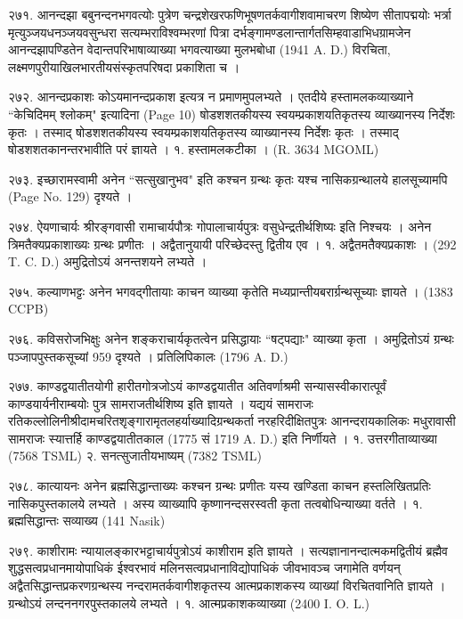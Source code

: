 २७१. आनन्दझा
बबुनन्दनभगवत्योः पुत्रेण चन्द्रशेखरफणिभूषणतर्कवागीशवामाचरण शिष्येण सीतापद्मयोः भर्त्रा मृत्युञ्जयधनञ्जयवसुन्धरा सत्यम्भराविश्वम्भरणां पित्रा दर्भङ्गामण्डलान्तार्गतसिम्हवाडाभिधग्रामजेन आनन्दझापण्डितेन वेदान्तपरिभाषाव्याख्या भगवत्याख्या मुलभबोधा (1941 A. D.) विरचिता, लक्ष्मणपुरीयाखिलभारतीयसंस्कृतपरिषदा प्रकाशिता च ।

२७२. आनन्दप्रकाशः
कोऽयमानन्दप्रकाश इत्यत्र न प्रमाणमुपलभ्यते । एतदीये हस्तामलकव्याख्याने ``केचिदिमम् श्लोकम्" इत्यादिना (Page 10) षोडशशतकीयस्य स्वयम्प्रकाशयतिकृतस्य व्याख्यानस्य निर्देशः कृतः । तस्माद् षोडशशतकीयस्य स्वयम्प्रकाशयतिकृतस्य व्याख्यानस्य निर्देशः कृतः । तस्माद् षोडशशतकानन्तरभावीति परं ज्ञायते ।
१. हस्तामलकटीका । (R. 3634 MGOML)

२७३. इच्छारामस्वामी
अनेन ``सत्सुखानुभव" इति कश्चन ग्रन्थः कृतः यश्च नासिकग्रन्थालये हालसूच्यामपि (Page No. 129) दृश्यते ।

२७४. ऐयणाचार्यः
श्रीरङ्गवासी रामाचार्यपौत्रः गोपालाचार्यपुत्रः वसुधेन्द्रतीर्थशिष्यः इति निश्चयः । अनेन त्रिमतैक्यप्रकाशाख्यः ग्रन्थः प्रणीतः । अद्वैतानुयायी परिच्छेदस्तु द्वितीय एव ।
१. अद्वैतमतैक्यप्रकाशः । (292 T. C. D.) अमुद्रितोऽयं अनन्तशयने लभ्यते ।

२७५. कल्याणभट्टः
अनेन भगवद्गीतायाः काचन व्याख्या कृतेति मध्यप्रान्तीयबरार्ग्रन्थसूच्याः ज्ञायते । (1383 CCPB)

२७६. कविसरोजभिक्षुः
अनेन शङ्कराचार्यकृतत्वेन प्रसिद्धायाः ``षट्पद्याः" व्याख्या कृता । अमुद्रितोऽयं ग्रन्थः पञ्जापपुस्तकसूच्यां 959 दृश्यते । प्रतिलिपिकालः (1796 A. D.)

२७७. काण्डद्वयातीतयोगी
हारीतगोत्रजोऽयं काण्डद्वयातीत अतिवर्णाश्रमी सन्यासस्वीकारात्पूर्वं काण्डयार्यनीराम्बयोः पुत्र सामराजतीर्थशिष्य इति ज्ञायते । यद्ययं सामराजः रतिकल्लोलिनीश्रीदामचरितशृङ्गारामृतलहर्याख्यादिग्रन्थकर्ता नरहरिदीक्षितपुत्रः आनन्दरायकालिकः मधुरावासी सामराजः स्यात्तर्हि काण्डद्वयातीतकाल (1775 सं 1719 A. D.) इति निर्णीयते ।
१. उत्तरगीताव्याख्या (7568 TSML)
२. सनत्सुजातीयभाष्यम् (7382 TSML)

२७८. कात्यायनः
अनेन ब्रह्मसिद्धान्ताख्यः कश्चन ग्रन्थः प्रणीतः यस्य खण्डिता काचन हस्तलिखितप्रतिः नासिकपुस्तकालये लभ्यते । अस्य व्याख्यापि कृष्णानन्दसरस्वती कृता तत्वबोधिन्याख्या वर्तते ।
१. ब्रह्मसिद्धान्तः सव्याख्य (141 Nasik)

२७९. काशीरामः 
न्यायालङ्कारभट्टाचार्यपुत्रोऽयं काशीराम इति ज्ञायते । सत्यज्ञानानन्दात्मकमद्वितीयं ब्रह्मैव शुद्धसत्वप्रधानमायोपाधिकं ईश्वरभावं मलिनसत्वप्रधानाविद्योपाधिकं जीवभावञ्च जगामेति वर्णयन् अद्वैतसिद्धान्तप्रकरणग्रन्थस्य नन्दरामतर्कवागीशकृतस्य आत्मप्रकाशकस्य व्याख्यां विरचितवानिति ज्ञायते । ग्रन्थोऽयं लन्दननगरपुस्तकालये लभ्यते ।
१. आत्मप्रकाशकव्याख्या (2400 I. O. L.)

